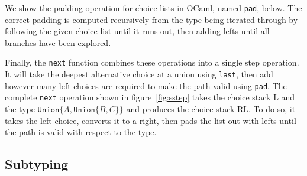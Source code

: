\documentclass[a4paper,english]{lipics-v2019}
\newcommand{\xt}[1]{\texttt{#1}}
\newcommand{\union}[2]{\xt{Union\{}#1,#2\xt{\}}}
\begin{document}
We show the padding operation for choice lists in OCaml, named
\verb|pad|, below.  The correct padding is computed recursively from
the type being iterated through by following the given choice list until it
runs out, then adding lefts until all branches have been explored.


Finally, the \verb|next| function combines these operations into
a single step operation. It will take the deepest alternative choice
at a union using \verb|last|, then add however many left
choices are required to make the path valid using \verb|pad|. The
complete \verb|next| operation shown in figure~\ref{fig:sstep} takes
the choice stack L and the type $\union{A}{\union{B}{C}}$ and produces the
choice stack RL. To do so, it takes the left choice, converts it to a right,
then pads the list out with lefts until the path is valid with respect to the 
type.

\subsection{Subtyping}
\end{document}

